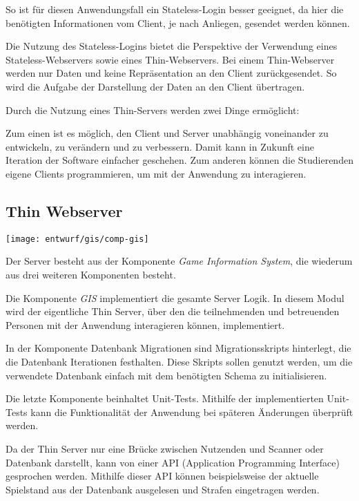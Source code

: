 So ist für diesen Anwendungsfall ein Stateless-Login besser geeignet, da hier die benötigten Informationen vom Client, je nach Anliegen, gesendet werden können. 

Die Nutzung des Stateless-Logins bietet die Perspektive der Verwendung eines Stateless-\linebreak Webservers sowie eines Thin-Webservers. Bei einem Thin-Webserver werden nur Daten und keine Repräsentation an den Client zurückgesendet. So wird die Aufgabe der Darstellung der Daten an den Client übertragen.

Durch die Nutzung eines Thin-Servers werden zwei Dinge ermöglicht: 

Zum einen ist es möglich, den Client und Server unabhängig voneinander zu entwickeln, zu verändern und zu verbessern. Damit kann in Zukunft eine Iteration der Software einfacher geschehen. Zum anderen können die Studierenden eigene Clients programmieren, um mit der Anwendung zu interagieren.

\subsection{Thin Webserver}
\begin{center}
	\texttt{[image: entwurf/gis/comp-gis]}
\end{center}

Der Server besteht aus der Komponente \textit{Game Information System}, die wiederum aus drei weiteren Komponenten besteht. 

Die Komponente \textit{GIS} implementiert die gesamte Server Logik. In diesem Modul wird der eigentliche Thin Server, über den die teilnehmenden und betreuenden Personen mit der Anwendung interagieren können, implementiert.

In der Komponente Datenbank Migrationen sind Migrationsskripts hinterlegt, die die Datenbank Iterationen festhalten. Diese Skripts sollen genutzt werden, um die verwendete Datenbank einfach mit dem benötigten Schema zu initialisieren. 

Die letzte Komponente beinhaltet Unit-Tests. Mithilfe der implementierten Unit-Tests kann die Funktionalität der Anwendung bei späteren Änderungen überprüft werden.

Da der Thin Server nur eine Brücke zwischen Nutzenden und Scanner oder Datenbank darstellt, kann von einer API (Application Programming Interface) gesprochen werden. Mithilfe dieser API können beispielsweise der aktuelle Spielstand aus der Datenbank ausgelesen und Strafen eingetragen werden.

